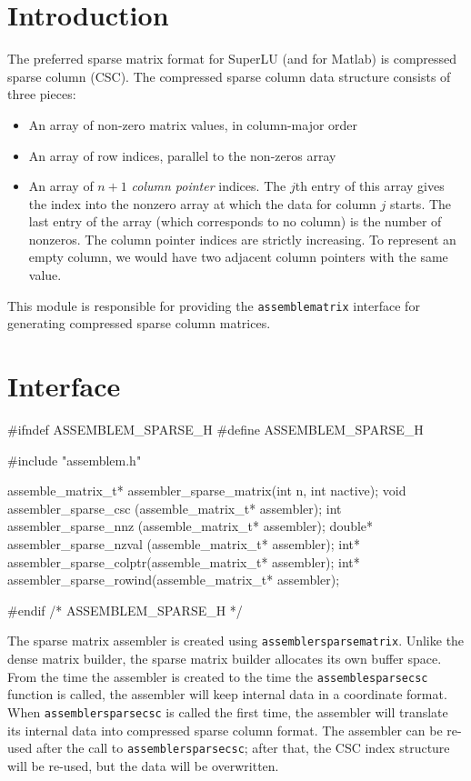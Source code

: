 
\section{Introduction}

The preferred sparse matrix format for SuperLU (and for Matlab)
is compressed sparse column (CSC).  The compressed sparse column
data structure consists of three pieces:
\begin{itemize}
  \item An array of non-zero matrix values, in column-major order
  \item An array of row indices, parallel to the non-zeros array
  \item An array of $n+1$ \emph{column pointer} indices.
        The $j$th entry of this array gives the index into the
        nonzero array at which the data for column $j$ starts.
        The last entry of the array (which corresponds to no
        column) is the number of nonzeros.  The column pointer indices
        are strictly increasing.  To represent an empty column,
        we would have two adjacent column pointers with the same value.
\end{itemize}

This module is responsible for providing the {\tt{}assemble{}matrix} interface
for generating compressed sparse column matrices.


\section{Interface}

\endmoddef
#ifndef ASSEMBLEM_SPARSE_H
#define ASSEMBLEM_SPARSE_H

#include "assemblem.h"

assemble_matrix_t* assembler_sparse_matrix(int n, int nactive);
void    assembler_sparse_csc   (assemble_matrix_t* assembler);
int     assembler_sparse_nnz   (assemble_matrix_t* assembler);
double* assembler_sparse_nzval (assemble_matrix_t* assembler);
int*    assembler_sparse_colptr(assemble_matrix_t* assembler);
int*    assembler_sparse_rowind(assemble_matrix_t* assembler);

#endif /* ASSEMBLEM_SPARSE_H */
\nwendcode{}\nwdocspar

The sparse matrix assembler is created using {\tt{}assembler{}sparse{}matrix}.
Unlike the dense matrix builder, the sparse matrix builder allocates
its own buffer space.  From the time the assembler is created to the time
the {\tt{}assemble{}sparse{}csc} function is called, the assembler will keep
internal data in a coordinate format.  When {\tt{}assembler{}sparse{}csc} is
called the first time, the assembler will translate its internal data
into compressed sparse column format.  The assembler can be re-used after
the call to {\tt{}assembler{}sparse{}csc}; after that, the CSC index
structure will be re-used, but the data will be overwritten.

